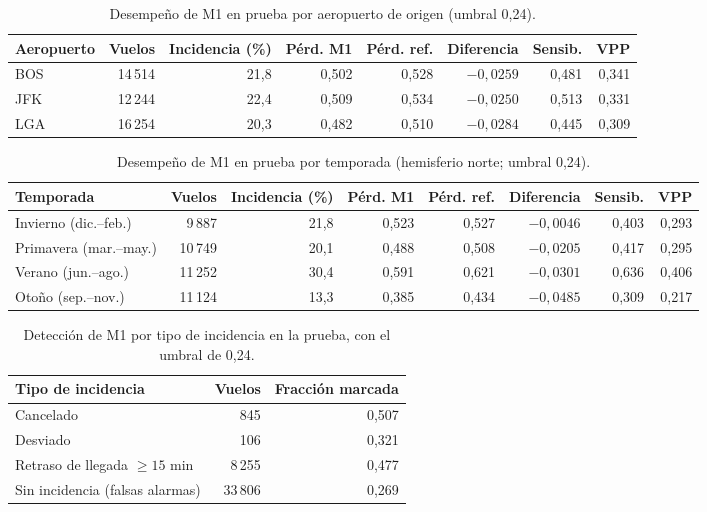 \documentclass[11pt,a4paper]{article}
\begin{document}
\begin{table}[ht]
\centering\small
\begin{tabular}{lrrrrrrr}
\toprule
Aeropuerto & Vuelos & Incidencia (\%) & Pérd. M1 & Pérd. ref. & Diferencia & Sensib. & VPP\\
\midrule
BOS & 14\,514 & 21,8 & 0,502 & 0,528 & $-0{,}0259$ & 0,481 & 0,341\\
JFK & 12\,244 & 22,4 & 0,509 & 0,534 & $-0{,}0250$ & 0,513 & 0,331\\
LGA & 16\,254 & 20,3 & 0,482 & 0,510 & $-0{,}0284$ & 0,445 & 0,309\\
\bottomrule
\end{tabular}
\caption{Desempeño de M1 en prueba por aeropuerto de origen (umbral 0,24).}
\label{tab:aeropuerto}
\end{table}
 
\begin{table}[ht]
\centering\small
\begin{tabular}{lrrrrrrr}
\toprule
Temporada & Vuelos & Incidencia (\%) & Pérd. M1 & Pérd. ref. & Diferencia & Sensib. & VPP\\
\midrule
Invierno (dic.--feb.) & 9\,887 & 21,8 & 0,523 & 0,527 & $-0{,}0046$ & 0,403 & 0,293\\
Primavera (mar.--may.) & 10\,749 & 20,1 & 0,488 & 0,508 & $-0{,}0205$ & 0,417 & 0,295\\
Verano (jun.--ago.) & 11\,252 & 30,4 & 0,591 & 0,621 & $-0{,}0301$ & 0,636 & 0,406\\
Otoño (sep.--nov.) & 11\,124 & 13,3 & 0,385 & 0,434 & $-0{,}0485$ & 0,309 & 0,217\\
\bottomrule
\end{tabular}
\caption{Desempeño de M1 en prueba por temporada (hemisferio norte; umbral 0,24).}
\label{tab:temporada}
\end{table}
 
\begin{table}[ht]
\centering\small
\begin{tabular}{lrr}
\toprule
Tipo de incidencia & Vuelos & Fracción marcada\\
\midrule
Cancelado & 845 & 0,507\\
Desviado & 106 & 0,321\\
Retraso de llegada $\ge 15$ min & 8\,255 & 0,477\\
Sin incidencia (falsas alarmas) & 33\,806 & 0,269\\
\bottomrule
\end{tabular}
\caption{Detección de M1 por tipo de incidencia en la prueba, con el umbral de 0,24.}
\label{tab:tipo}
\end{table}
 
\end{document}

